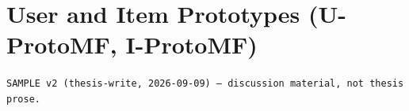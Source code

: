 \documentclass[11pt,a4paper]{article}
\begin{document}
\section*{User and Item Prototypes (U-ProtoMF, I-ProtoMF)}
{\scriptsize\color{gray}\texttt{SAMPLE v2 (thesis-write, 2026-09-09) — discussion material, not thesis prose.}\par}
\vspace{1em}


\end{document}
